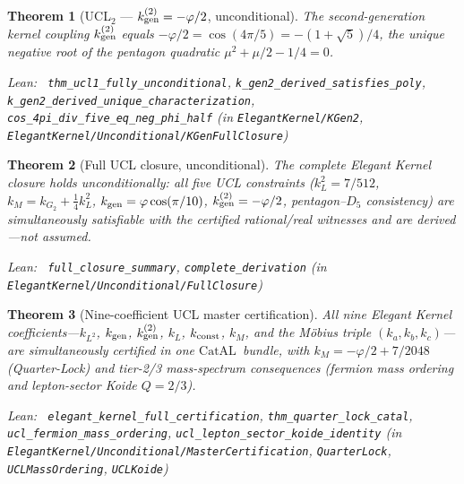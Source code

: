 \documentclass[11pt,a4paper]{article}
\newenvironment{leanref}%
  {\par\smallskip\noindent\begingroup\raggedright\textup{Lean:}~}%
  {\par\endgroup}
\newtheorem{theorem}{Theorem}[section]
\theoremstyle{definition}
\newcommand{\CatAL}{\ensuremath{\mathrm{CatAL}}}
\begin{document}
\begin{theorem}[UCL$_2$ --- $k_{\rm gen}^{(2)} = -\varphi/2$, unconditional]\label{thm:ucl2}
The second-generation kernel coupling $k_{\rm gen}^{(2)}$ equals
$-\varphi/2 = \cos(4\pi/5) = -(1+\sqrt{5})/4$, the unique
negative root of the pentagon quadratic $\mu^2 + \mu/2 - 1/4 = 0$.

\begin{leanref} \lstinline|thm_ucl1_fully_unconditional|,
\lstinline|k_gen2_derived_satisfies_poly|,
\lstinline|k_gen2_derived_unique_characterization|,
\lstinline|cos_4pi_div_five_eq_neg_phi_half|
\textup{(in \texttt{ElegantKernel/KGen2},
\texttt{ElegantKernel/Unconditional/KGenFullClosure})}
\end{leanref}
\end{theorem}

\begin{theorem}[Full UCL closure, unconditional]\label{thm:ucl-full}
The complete Elegant Kernel closure holds unconditionally:
all five UCL constraints ($k_L^2 = 7/512$, $k_M = k_{G_2} + \tfrac{1}{4}k_L^2$,
$k_{\rm gen} = \varphi\cos(\pi/10)$, $k_{\rm gen}^{(2)} = -\varphi/2$,
pentagon--$D_5$ consistency) are simultaneously satisfiable with
the certified rational/real witnesses and are derived---not assumed.

\begin{leanref} \lstinline|full_closure_summary|,
\lstinline|complete_derivation|
\textup{(in \nolinkurl{ElegantKernel/Unconditional/FullClosure})}
\end{leanref}
\end{theorem}

\begin{theorem}[Nine-coefficient UCL master certification]\label{thm:ucl-master-083c}
All nine Elegant Kernel coefficients---$k_{L^2}$, $k_{\rm gen}$, $k_{\rm gen}^{(2)}$,
$k_L$, $k_{\rm const}$, $k_M$, and the Möbius triple $(k_a,k_b,k_c)$---are
simultaneously certified in one \CatAL\ bundle, with
$k_M = -\varphi/2 + 7/2048$ (Quarter-Lock) and tier-2/3 mass-spectrum consequences
(fermion mass ordering and lepton-sector Koide $Q=2/3$).

\begin{leanref} \lstinline|elegant_kernel_full_certification|,
\lstinline|thm_quarter_lock_catal|,
\lstinline|ucl_fermion_mass_ordering|,
\lstinline|ucl_lepton_sector_koide_identity|
\textup{(in \nolinkurl{ElegantKernel/Unconditional/MasterCertification},
\nolinkurl{QuarterLock}, \nolinkurl{UCLMassOrdering}, \nolinkurl{UCLKoide})}
\end{leanref}
\end{theorem}
\end{document}
